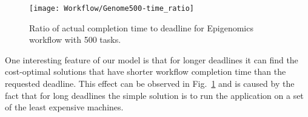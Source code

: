 {    \begin{figure}[tb]
       \centering \texttt{[image: Workflow/Genome500-time\_ratio]}
       \caption[Ratio of actual completion time to deadline for Epigenomics workflow.]{Ratio of actual completion time to deadline for Epigenomics workflow with 500 tasks.
       \label{fig:workflow:genome-500-ratio}}
    \end{figure}
    
    One interesting feature of our model is that for longer deadlines it can find the cost-optimal solutions that have shorter workflow completion time than the requested deadline. This effect can be observed in Fig.~\ref{fig:workflow:genome-500-ratio} and is caused by the fact that for long deadlines the simple solution is to run the application on a set of the least expensive machines. 
    
}
